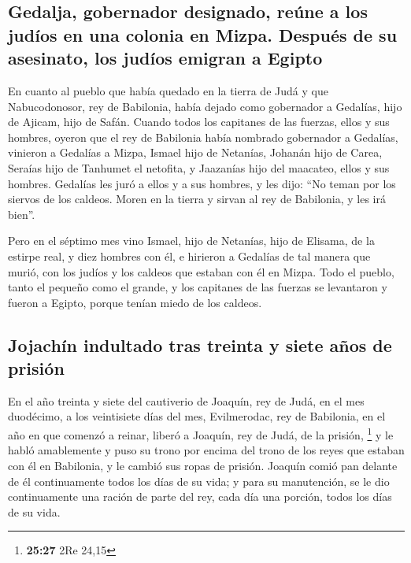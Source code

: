 \hypertarget{gedalja-gobernador-designado-reuxfane-a-los-juduxedos-en-una-colonia-en-mizpa.-despuuxe9s-de-su-asesinato-los-juduxedos-emigran-a-egipto}{%
\subsection{Gedalja, gobernador designado, reúne a los judíos en una
colonia en Mizpa. Después de su asesinato, los judíos emigran a
Egipto}\label{gedalja-gobernador-designado-reuxfane-a-los-juduxedos-en-una-colonia-en-mizpa.-despuuxe9s-de-su-asesinato-los-juduxedos-emigran-a-egipto}}

 En cuanto al pueblo que había quedado en la tierra de
Judá y que Nabucodonosor, rey de Babilonia, había dejado como gobernador
a Gedalías, hijo de Ajicam, hijo de Safán.  Cuando todos
los capitanes de las fuerzas, ellos y sus hombres, oyeron que el rey de
Babilonia había nombrado gobernador a Gedalías, vinieron a Gedalías a
Mizpa, Ismael hijo de Netanías, Johanán hijo de Carea, Seraías hijo de
Tanhumet el netofita, y Jaazanías hijo del maacateo, ellos y sus
hombres.  Gedalías les juró a ellos y a sus hombres, y
les dijo: ``No teman por los siervos de los caldeos. Moren en la tierra
y sirvan al rey de Babilonia, y les irá bien''.

 Pero en el séptimo mes vino Ismael, hijo de Netanías,
hijo de Elisama, de la estirpe real, y diez hombres con él, e hirieron a
Gedalías de tal manera que murió, con los judíos y los caldeos que
estaban con él en Mizpa.  Todo el pueblo, tanto el
pequeño como el grande, y los capitanes de las fuerzas se levantaron y
fueron a Egipto, porque tenían miedo de los caldeos.

\hypertarget{jojachuxedn-indultado-tras-treinta-y-siete-auxf1os-de-prisiuxf3n}{%
\subsection{Jojachín indultado tras treinta y siete años de
prisión}\label{jojachuxedn-indultado-tras-treinta-y-siete-auxf1os-de-prisiuxf3n}}

 En el año treinta y siete del cautiverio de Joaquín, rey
de Judá, en el mes duodécimo, a los veintisiete días del mes,
Evilmerodac, rey de Babilonia, en el año en que comenzó a reinar, liberó
a Joaquín, rey de Judá, de la prisión, \footnote{\textbf{25:27} 2Re
  24,15}  y le habló amablemente y puso su trono por
encima del trono de los reyes que estaban con él en Babilonia,
 y le cambió sus ropas de prisión. Joaquín comió pan
delante de él continuamente todos los días de su vida;  y
para su manutención, se le dio continuamente una ración de parte del
rey, cada día una porción, todos los días de su vida.
